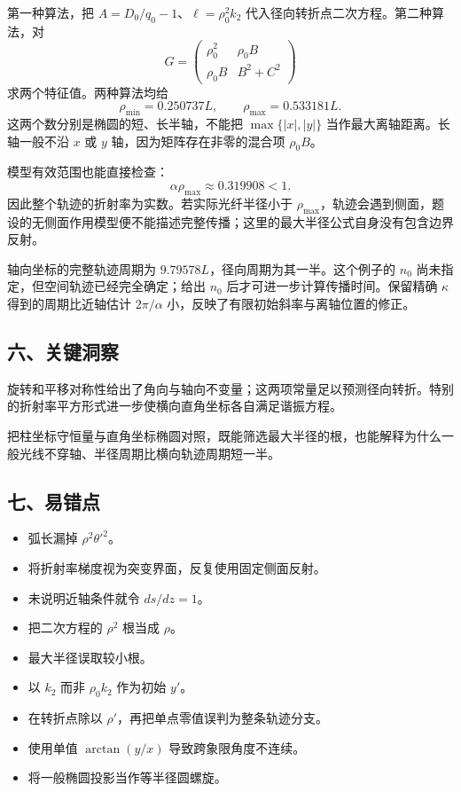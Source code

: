 \documentclass[12pt,a4paper,fontset=fandol]{ctexart}
\providecommand{\tightlist}{\setlength{\itemsep}{0pt}\setlength{\parskip}{0pt}}
\begin{document}
第一种算法，把 \(A=D_0/q_0-1\)、\(\ell=\rho_0^2k_2\)
代入径向转折点二次方程。第二种算法，对 \[
G=\begin{pmatrix}
\rho_0^2&\rho_0B\\
\rho_0B&B^2+C^2
\end{pmatrix}
\] 求两个特征值。两种算法均给 \[
\rho_{\min}=0.250737L,\qquad
\boxed{\rho_{\max}=0.533181L.}
\] 这两个数分别是椭圆的短、长半轴，不能把 \(\max\{|x|,|y|\}\)
当作最大离轴距离。长轴一般不沿 \(x\) 或 \(y\)
轴，因为矩阵存在非零的混合项 \(\rho_0B\)。

模型有效范围也能直接检查： \[
\alpha\rho_{\max}\approx0.319908<1.
\] 因此整个轨迹的折射率为实数。若实际光纤半径小于
\(\rho_{\max}\)，轨迹会遇到侧面，题设的无侧面作用模型便不能描述完整传播；这里的最大半径公式自身没有包含边界反射。

轴向坐标的完整轨迹周期为 \(9.79578L\)，径向周期为其一半。这个例子的
\(n_0\) 尚未指定，但空间轨迹已经完全确定；给出 \(n_0\)
后才可进一步计算传播时间。保留精确 \(\kappa\) 得到的周期比近轴估计
\(2\pi/\alpha\) 小，反映了有限初始斜率与离轴位置的修正。

\subsection{六、关键洞察}\label{ux516dux5173ux952eux6d1eux5bdf-6}

旋转和平移对称性给出了角向与轴向不变量；这两项常量足以预测径向转折。特别的折射率平方形式进一步使横向直角坐标各自满足谐振方程。

把柱坐标守恒量与直角坐标椭圆对照，既能筛选最大半径的根，也能解释为什么一般光线不穿轴、半径周期比横向轨迹周期短一半。

\subsection{七、易错点}\label{ux4e03ux6613ux9519ux70b9-6}

\begin{itemize}
\tightlist
\item
  弧长漏掉 \(\rho^2\theta'^2\)。
\item
  将折射率梯度视为突变界面，反复使用固定侧面反射。
\item
  未说明近轴条件就令 \(ds/dz=1\)。
\item
  把二次方程的 \(\rho^2\) 根当成 \(\rho\)。
\item
  最大半径误取较小根。
\item
  以 \(k_2\) 而非 \(\rho_0k_2\) 作为初始 \(y'\)。
\item
  在转折点除以 \(\rho'\)，再把单点零值误判为整条轨迹分支。
\item
  使用单值 \(\arctan(y/x)\) 导致跨象限角度不连续。
\item
  将一般椭圆投影当作等半径圆螺旋。
\end{itemize}
\end{document}

